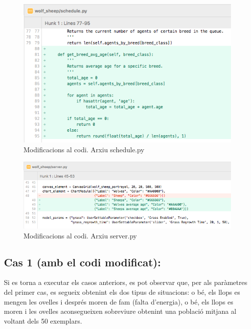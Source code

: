 \documentclass{article} %
\begin{document}
{	\begin{figure}[H]
		\begin{changemargin}{-1cm}{0.5cm}
			\includegraphics[width=14cm]{code/schedule}
			\centering
			\color{blue}
			\caption{Modificacions al codi. Arxiu schedule.py}\label{visina8}
		\end{changemargin}
	\end{figure}

	\begin{figure}[H]
		\begin{changemargin}{-1cm}{0.5cm}
			\includegraphics[width=14cm]{code/server}
			\centering
			\color{blue}
			\caption{Modificacions al codi. Arxiu server.py}\label{visina8}
		\end{changemargin}
	\end{figure}

	\subsection*{Cas 1 (amb el codi modificat):}

	Si es torna a executar els casos anteriors, es pot observar que, per als paràmetres del primer cas, es segueix obtenint els dos tipus de situacions: o bé, els llops es mengen les ovelles i després moren de fam (falta d'energia), o bé, els llops es moren i les ovelles aconsegueixen sobreviure obtenint una població mitjana al voltant dels 50 exemplars. \\

}
\end{document}
